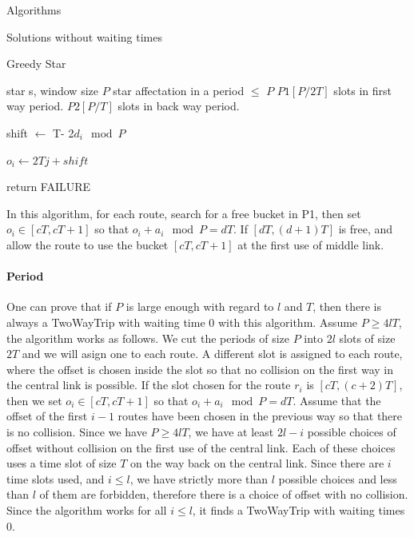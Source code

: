 \documentclass[a4paper,10pt]{report}
\begin{document}
\begin{chapter}{Algorithms}
\begin{section}{Solutions without waiting times}
\begin{subsection}{Greedy Star}
 

\begin{algorithm}[H]
\caption{Greedy Star assignment algorithm}
\begin{algorithmic}
\REQUIRE star s, window size $P$
\ENSURE star affectation in a period $\leq $ $P$ 
\STATE $P1[P/2T]$ slots in first way period.
\STATE $P2[P/T]$ slots in back way period.



\STATE shift $\leftarrow$ T- 2$d_i \mod P$ 


\STATE $o_i \leftarrow 2Tj + shift$
\ENDIF

\ENDIF

\STATE return FAILURE
\ENDIF
\ENDFOR

\ENDFOR

\end{algorithmic}
\end{algorithm}




In this algorithm, for each route, search for a free bucket in P1, then set $o_i \in [cT,cT+1]$ so that $o_i + a_i \mod P = dT$.
If $[dT,(d+1)T]$ is free, and allow the route to use the bucket $[cT,cT+1]$ at the first use of middle link.\\


\paragraph{Period}
One can prove that if $P$ is large enough with regard to $l$ and $T$, then there is always a TwoWayTrip
with waiting time $0$ with this algorithm.
 Assume $P \geq 4lT$, the algorithm works as follows. 
We cut the periods of size $P$ into $2l$ slots of size $2T$ and we will asign one to each route.
A different slot is assigned to each route, where the offset is chosen inside the slot so that 
no collision on the first way in the central link is possible. If the slot chosen for the route $r_i$ is $[cT,(c+2)T]$,
then we set $o_i \in [cT,cT+1]$ so that $o_i + a_i \mod P = dT$. Assume that the offset of the first $i-1$ routes have been 
chosen in the previous way so that there is no collision. Since we have $P \geq 4lT$, we have at least $2l-i$ possible choices of offset without collision on the first use of the central link. Each of these choices uses a time slot of size $T$ on the way back on the central link. Since there are $i$ time slots used, and $i \leq l$, we have strictly more than $l$ possible choices and less than $l$ of them are forbidden, therefore there is a choice of offset with no collision. 
Since the algorithm works for all $i \leq l$, it finds a TwoWayTrip with waiting times $0$. 


\end{subsection}
\end{section}
\end{chapter}
\end{document}
